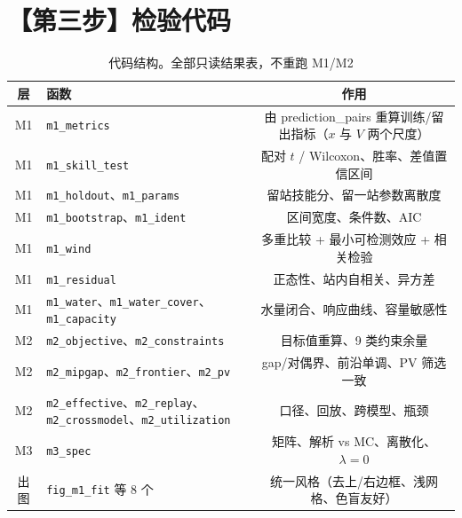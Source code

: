 \documentclass[11pt,a4paper]{ctexart}
\begin{document}
\section{【第三步】检验代码}

\begin{table}[htbp]\centering\footnotesize
\begin{tabularx}{\textwidth}{|c|X|c|}
\toprule
层 & 函数 & 作用 \\
\midrule
M1 & \texttt{m1\_metrics} & 由 prediction\_pairs 重算训练/留出指标（$x$ 与 $V$ 两个尺度） \\
M1 & \texttt{m1\_skill\_test} & 配对 $t$ / Wilcoxon、胜率、差值置信区间 \\
M1 & \texttt{m1\_holdout}、\texttt{m1\_params} & 留站技能分、留一站参数离散度 \\
M1 & \texttt{m1\_bootstrap}、\texttt{m1\_ident} & 区间宽度、条件数、AIC \\
M1 & \texttt{m1\_wind} & 多重比较 + 最小可检测效应 + 相关检验 \\
M1 & \texttt{m1\_residual} & 正态性、站内自相关、异方差 \\
M1 & \texttt{m1\_water}、\texttt{m1\_water\_cover}、\texttt{m1\_capacity} & 水量闭合、响应曲线、容量敏感性 \\
M2 & \texttt{m2\_objective}、\texttt{m2\_constraints} & 目标值重算、9 类约束余量 \\
M2 & \texttt{m2\_mipgap}、\texttt{m2\_frontier}、\texttt{m2\_pv} & gap/对偶界、前沿单调、PV 筛选一致 \\
M2 & \texttt{m2\_effective}、\texttt{m2\_replay}、\texttt{m2\_crossmodel}、\texttt{m2\_utilization} & 口径、回放、跨模型、瓶颈 \\
M3 & \texttt{m3\_spec} & 矩阵、解析 vs MC、离散化、$\lambda=0$ \\
出图 & \texttt{fig\_m1\_fit} 等 8 个 & 统一风格（去上/右边框、浅网格、色盲友好） \\
\bottomrule
\end{tabularx}
\caption{代码结构。全部只读结果表，不重跑 M1/M2}\label{tab:code}
\end{table}
\end{document}
